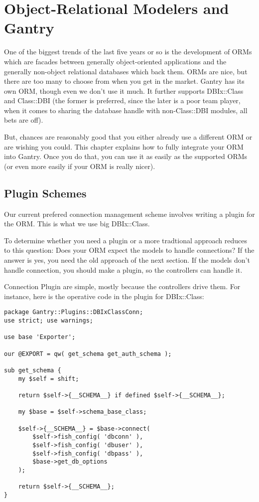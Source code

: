 \chapter{Object-Relational Modelers and Gantry}
\label{chap:orms}

One of the biggest trends of the last five years or so is the development
of ORMs which are facades between generally object-oriented applications and
the generally non-object relational databases which back them.  ORMs are
nice, but there are too many to choose from when you get in the market.
Gantry has its own ORM, though even we don't use it much.  It further
supports DBIx::Class and Class::DBI (the former is preferred, since the
later is a poor team player, when it comes to sharing the database handle
with non-Class::DBI modules, all bets are off).

But, chances are reasonably good that you either already use a different
ORM or are wishing you could.  This chapter explains how to fully integrate
your ORM into Gantry.  Once you do that, you can use it as easily as the
supported ORMs (or even more easily if your ORM is really nicer).

\section{Plugin Schemes}

Our current prefered connection management scheme involves writing a
plugin for the ORM.  This is what we use big DBIx::Class.

To determine whether you need a plugin or a more tradtional approach reduces
to this question: Does your ORM expect the models to handle connections?
If the answer is yes, you need the old approach of the next section.
If the models don't handle connection, you should make a plugin, so
the controllers can handle it.

Connection Plugin are simple, mostly because the controllers drive them.
For instance, here is the operative code in the plugin for DBIx::Class:

\begin{verbatim}
package Gantry::Plugins::DBIxClassConn;
use strict; use warnings;

use base 'Exporter';

our @EXPORT = qw( get_schema get_auth_schema );

sub get_schema {
    my $self = shift;

    return $self->{__SCHEMA__} if defined $self->{__SCHEMA__};

    my $base = $self->schema_base_class;

    $self->{__SCHEMA__} = $base->connect(
        $self->fish_config( 'dbconn' ),
        $self->fish_config( 'dbuser' ),
        $self->fish_config( 'dbpass' ),
        $base->get_db_options
    );

    return $self->{__SCHEMA__};
}
\end{verbatim}

